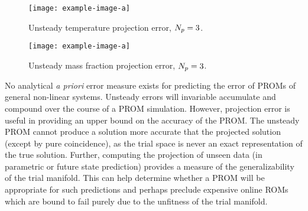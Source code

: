 \begin{figure}
    \begin{minipage}{0.45\linewidth}
        \texttt{[image: example-image-a]}
        \caption{\label{fig:projErrTempTime}Unsteady temperature projection error, $N_p = 3$.}
    \end{minipage}
    \hspace{1em}
    \begin{minipage}{0.45\linewidth}
        \texttt{[image: example-image-a]}
        \caption{\label{fig:projErrMFTime}Unsteady mass fraction projection error, $N_p = 3$.}
    \end{minipage}
\end{figure}
%

No analytical \textit{a priori} error measure exists for predicting the error of PROMs of general non-linear systems. Unsteady errors will invariable accumulate and compound over the course of a PROM simulation. However, projection error is useful in providing an upper bound on the accuracy of the PROM. The unsteady PROM cannot produce a solution more accurate that the projected solution (except by pure coincidence), as the trial space is never an exact representation of the true solution. Further, computing the projection of unseen data (in parametric or future state prediction) provides a measure of the generalizability of the trial manifold. This can help determine whether a PROM will be appropriate for such predictions and perhaps preclude expensive online ROMs which are bound to fail purely due to the unfitness of the trial manifold.